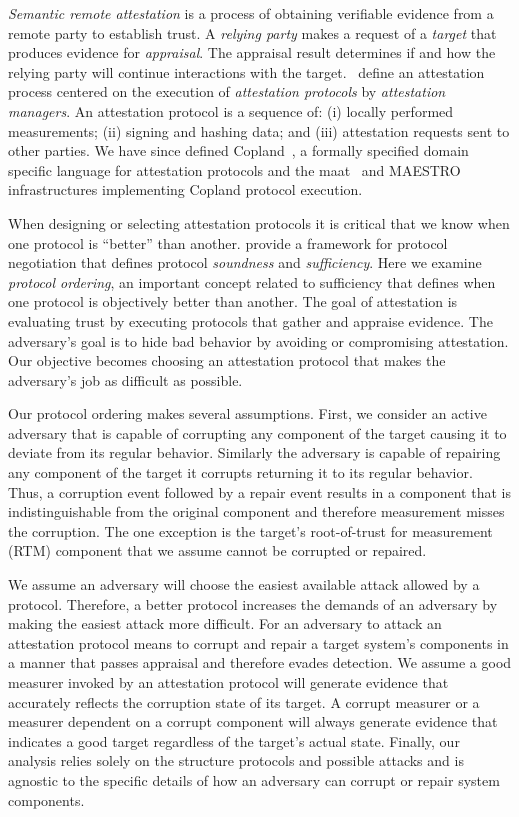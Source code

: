 \documentclass[runningheads]{llncs}
\theoremstyle{definition}
\begin{document}
\emph{Semantic remote
  attestation}\citep{Haldar:04:Semantic-Remote,coker2011principles} is
a process of obtaining verifiable evidence from a remote party to
establish trust.  A \emph{relying party} makes a request of a
\emph{target} that produces evidence for \emph{appraisal}. The
appraisal result determines if and how the relying party will continue
interactions with the target.  \citet{Coker::Principles-of-R}~define
an attestation process centered on the execution of \emph{attestation
  protocols} by \emph{attestation managers}.  An attestation protocol
is a sequence of: (i) locally performed measurements; (ii) signing and
hashing data; and (iii) attestation requests sent to other parties.
We have since defined Copland~\citep{Rowe:2019:Orchestrating}, a
formally specified domain specific language for attestation protocols
and the maat~\citep{Pendergrass:2018:Maat} and
MAESTRO~\citep{Petz:2021:faithful} infrastructures implementing
Copland protocol execution.

When designing or selecting attestation protocols it is critical that
we know when one protocol is ``better'' than another.
\citet{Fritz:2023:framework} provide a framework for protocol
negotiation that defines protocol \emph{soundness} and
\emph{sufficiency}.  Here we examine \emph{protocol ordering}, an
important concept related to sufficiency that defines when one
protocol is objectively better than another.  The goal of attestation
is evaluating trust by executing protocols that gather and appraise
evidence.  The adversary's goal is to hide bad behavior by avoiding or
compromising attestation.  Our objective becomes choosing an
attestation protocol that makes the adversary's job as difficult as
possible.

Our protocol ordering makes several assumptions. First, we consider an
active adversary that is capable of corrupting any component of the
target causing it to deviate from its regular behavior.  Similarly the
adversary is capable of repairing any component of the target it
corrupts returning it to its regular behavior. Thus, a corruption
event followed by a repair event results in a component that is
indistinguishable from the original component and therefore
measurement misses the corruption. The one exception is the target's
root-of-trust for measurement (RTM) component that we assume cannot be
corrupted or repaired.

We assume an adversary will choose the easiest available attack
allowed by a protocol. Therefore, a better protocol increases the
demands of an adversary by making the easiest attack more
difficult. For an adversary to attack an attestation protocol means to
corrupt and repair a target system's components in a manner that
passes appraisal and therefore evades detection.  We assume a good
measurer invoked by an attestation protocol will generate evidence
that accurately reflects the corruption state of its target.  A
corrupt measurer or a measurer dependent on a corrupt component will
always generate evidence that indicates a good target regardless of
the target's actual state.  Finally, our analysis relies solely on the
structure protocols and possible attacks and is agnostic to the
specific details of how an adversary can corrupt or repair system
components.
\end{document}
